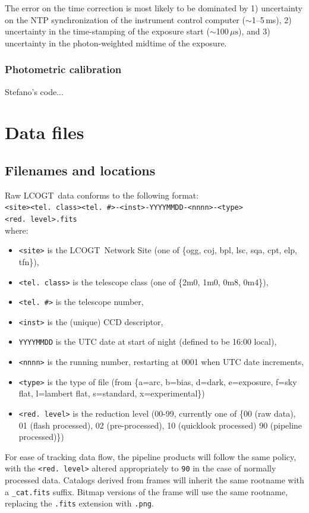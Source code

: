 \documentclass[twoside,11pt,nolof]{starlink}
\providecommand{\LCO}{LCOGT}
\providecommand{\rmn}[1] {\mathrm{#1}}
\begin{document}
The error on the time correction is most likely to be dominated by 1)
uncertainty on the NTP synchronization of the instrument control computer
($\sim$1--5\,ms), 2) uncertainty in the time-stamping of the exposure start
($\sim$100\,$\mu\rmn{s}$), and 3) uncertainty in the photon-weighted midtime of the
exposure.

\subsubsection{Photometric calibration}
Stefano's code...

\section{Data files}

\subsection{Filenames and locations}
Raw \LCO\ data conforms to the following format:\\
\texttt{<site><tel.\ class><tel.\ \#>-<inst>-YYYYMMDD-<nnnn>-<type><red.\ level>.fits}\\
where:
\begin{itemize}
\item{\texttt{<site>}} is the \LCO\ Network Site (one of \{ogg, coj, bpl, lsc, sqa, cpt, elp, tfn\}),
\item{\texttt{<tel.\ class>}} is the telescope class (one of \{2m0, 1m0, 0m8, 0m4\}),
\item{\texttt{<tel.\ \#>}} is the telescope number,
\item{\texttt{<inst>}} is the (unique) CCD descriptor,
\item{\texttt{YYYYMMDD}} is the UTC date at start of night (defined to be 16:00 local),
\item{\texttt{<nnnn>}} is the running number, restarting at 0001 when UTC date increments,
\item{\texttt{<type>}} is the type of file (from \{a=arc, b=bias, d=dark, e=exposure, f=sky flat, l=lambert flat, s=standard, x=experimental\}) 
\item{\texttt{<red.\ level>}} is the reduction level (00-99, currently one of
\{00 (raw data), 01 (flash processed), 02 (pre-processed), 10 (quicklook
processed) 90 (pipeline processed)\})
\end{itemize}

For ease of tracking data flow, the pipeline products will follow the same
policy, with the \texttt{<red.\ level>} altered appropriately to \texttt{90} in
the case of normally processed data. Catalogs derived from frames will inherit
the same rootname with a \texttt{\_cat.fits} suffix. Bitmap versions of the
frame will use the same rootname, replacing the \texttt{.fits} extension with
\texttt{.png}.
\end{document}
